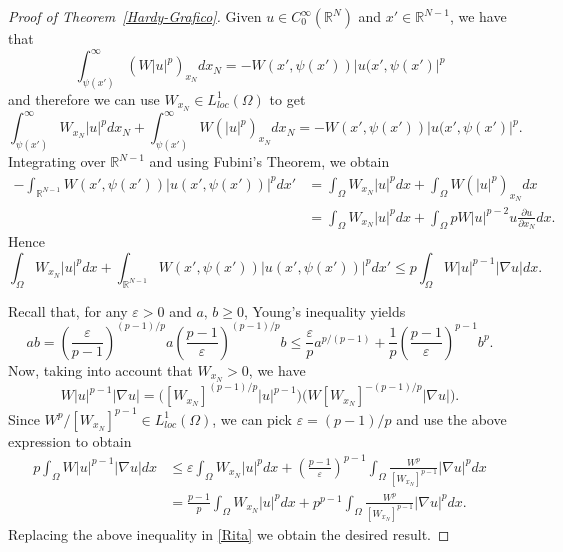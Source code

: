 \documentclass[12pt]{amsart}
\theoremstyle{definition}
\theoremstyle{plain}
\newcommand{\dint}{\int_{\Omega}}
\begin{document}
\begin{proof}[Proof of Theorem~\ref{Hardy-Grafico}]
		Given $u\in C_0^\infty(\mathbb{R}^N)$ and $x'\in \mathbb{R}^{N-1}$, we have that 
\begin{equation*}
     \int_{\psi(x')}^\infty \left(W|u|^p\right)_{x_N}dx_N=-	W(x',\psi(x'))|u(x',\psi(x')|^{p}
 \end{equation*}
 and therefore we can use $W_{x_N}\in L^1_{loc}({\Omega})$ to get
 $$
			\int_{\psi(x')}^\infty W_{x_N}|u|^pdx_N+\int_{\psi(x')}^\infty W(|u|^p)_{x_N}dx_N
            =-	W(x',\psi(x'))|u(x',\psi(x')|^{p}.
		$$
Integrating over $\mathbb{R}^{N-1}$ and using Fubini's Theorem, we obtain
		\begin{align*}
		    - \int_{\mathbb{R}^{N-1}} W(x',\psi(x'))|u(x',\psi(x'))|^{p}dx' & =          
            \int_\Omega W_{x_N}|u|^pdx + \int_\Omega W(|u|^p)_{x_N}dx  \\
            & = \int_\Omega W_{x_N}|u|^pdx + \int_\Omega pW|u|^{p-2} u 
            \frac{\partial u}{\partial x_N}dx.
		\end{align*}
        Hence
		\begin{equation}\label{Rita}
			\dint W_{x_N}|u|^pdx+ 	\int_{\mathbb{R}^{N-1}} W(x',\psi(x'))
            |u(x',\psi(x'))|^{p}dx' 
            \leq p \int_\Omega W|u|^{p-1}|\nabla u|dx.
		\end{equation}
  
  Recall that, for any $\varepsilon>0$ and $a,\,b \geq 0$, Young's inequality yields
		$$
			ab=\left(\frac{\varepsilon}{p-1}\right)^{(p-1)/p}a
            \left(\frac{p-1}{\varepsilon}\right)^{(p-1)/p}b
			 \leq\frac{\varepsilon}{p}a^{p/(p-1)}+\frac{1}{p}
             \left(\frac{p-1}{\varepsilon}\right)^{p-1}b^p.
		$$
Now, taking into account that $W_{x_N}>0$, we have
$$
    W|u|^{p-1}|\nabla u|= \Big( \left[W_{x_N}\right]^{(p-1)/p}|u|^{p-1} \Big) 
    \Big( W \left[W_{x_N}\right]^{{-(p-1)/p}} |\nabla u|\Big).
$$
Since  $W^p/[W_{x_N}]^{p-1}  \in L^1_{loc}(\Omega)$, we can pick $\varepsilon = (p-1)/p$ 
and use the above expression to obtain
		\begin{align*}
		    p\int_\Omega W|u|^{p-1}|\nabla u|dx & \leq \varepsilon\int_\Omega W_{x_N}|u|^pdx
            +\left(\frac{p-1}{\varepsilon}\right)^{p-1}\int_\Omega
            \frac{W^p}{\left[W_{x_N}\right]^{p-1}}|\nabla u|^p dx \\
            & = \frac{p-1}{p} \int_\Omega W_{x_N}|u|^pdx + p^{p-1} \int_\Omega
            \frac{W^p}{\left[ W_{x_N}\right]^{p-1}}|\nabla u|^p dx.
		\end{align*}
Replacing the above  inequality in \eqref{Rita} we obtain the desired result.
\end{proof}
\end{document}
